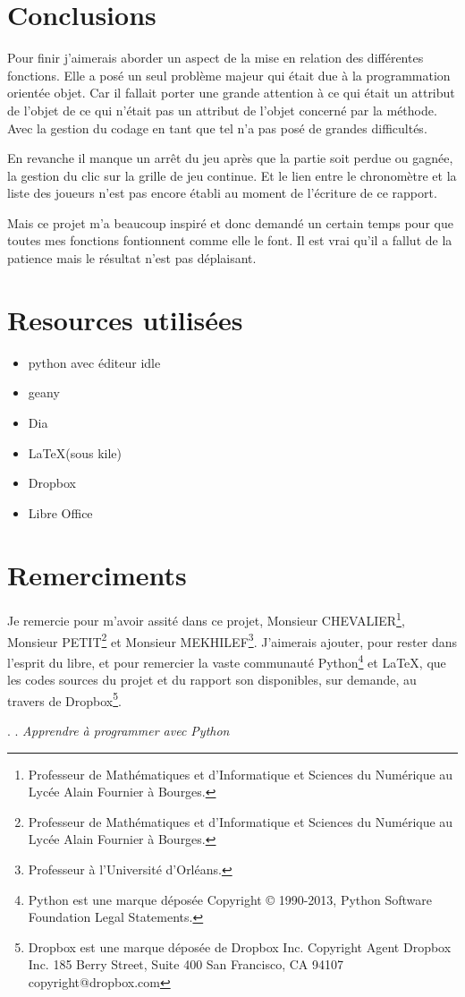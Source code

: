 \documentclass[a4paper,11pt]{article}
\newcommand{\ml}[0]{\par\noindent}
\begin{document}
\section{Conclusions}
Pour finir j'aimerais aborder un aspect de la mise en relation des différentes fonctions. Elle a posé un seul problème majeur
qui était due à la programmation orientée objet. Car il fallait porter une grande attention à ce qui était un attribut de l'objet
de ce qui n'était pas un attribut de l'objet concerné par la méthode. Avec la gestion du codage en tant que tel n'a pas posé de grandes difficultés.
\ml
En revanche il manque un arrêt du jeu après que la partie soit perdue ou gagnée, la gestion du clic sur la grille de jeu continue. Et le
lien entre le chronomètre et la liste des joueurs n'est pas encore établi au moment de l'écriture de ce rapport.
\ml
Mais ce projet m'a beaucoup inspiré et donc demandé un certain temps pour que toutes mes fonctions fontionnent comme elle le font.
Il est vrai qu'il a fallut de la patience mais le résultat n'est pas déplaisant.
\section*{Resources utilisées}
\begin{itemize}
 \item python avec éditeur idle
 \item geany
 \item Dia
 \item \LaTeX (sous kile)
 \item Dropbox
 \item Libre Office
\end{itemize}

\section*{Remerciments}
Je remercie pour m'avoir assité dans ce projet, Monsieur CHEVALIER\footnote{Professeur de Mathématiques et d'Informatique et Sciences du Numérique au 
Lycée Alain Fournier à Bourges.}, Monsieur PETIT\footnote{Professeur de Mathématiques et d'Informatique et Sciences du Numérique au 
Lycée Alain Fournier à Bourges.} et Monsieur MEKHILEF\footnote{Professeur à l'Université d'Orléans.}.
J'aimerais ajouter, pour rester dans l'esprit du libre, et pour remercier la vaste communauté Python\footnote{Python est une marque déposée Copyright © 1990-2013, Python Software Foundation
Legal Statements.} et \LaTeX, que les codes sources
du projet et du rapport son disponibles, sur demande, au travers de Dropbox\footnote{Dropbox est une marque déposée de Dropbox Inc. Copyright Agent
Dropbox Inc.
185 Berry Street, Suite 400
San Francisco, CA 94107
copyright@dropbox.com}.
%
\nocite{*}
\begin{thebibliography}{100}
.
. {\it Apprendre à programmer avec Python}
\end{thebibliography}
%
 \newpage
\end{document}
